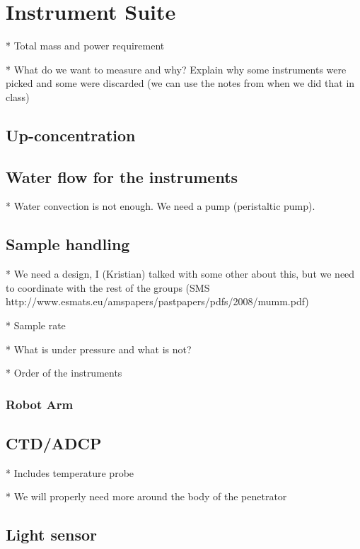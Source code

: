 \chapter{Instrument Suite}

* Total mass and power requirement

* What do we want to measure and why? Explain why some instruments were picked and some were discarded (we can use the notes from when we did that in class)

\section{Up-concentration}

\section{Water flow for the instruments} %

* Water convection is not enough. We need a pump (peristaltic pump).

\section{Sample handling}

* We need a design, I (Kristian) talked with some other about this, but we need to coordinate with the rest of the groups
   (SMS http://www.esmats.eu/amspapers/pastpapers/pdfs/2008/mumm.pdf)

* Sample rate

* What is under pressure and what is not?

* Order of the instruments

\subsection{Robot Arm} %


\section{CTD/ADCP} %

* Includes temperature probe

    * We will properly need more around the body of the penetrator

\section{Light sensor}

